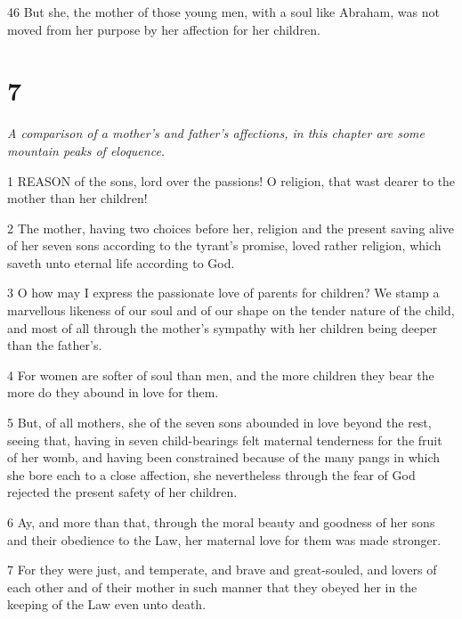 \par 46 But she, the mother of those young men, with a soul like Abraham, was not moved from her purpose by her affection for her children.

\chapter{7}

\par \textit{A comparison of a mother's and father's affections, in this chapter are some mountain peaks of eloquence.}

\par 1 REASON of the sons, lord over the passions! O religion, that wast dearer to the mother than her children!

\par 2 The mother, having two choices before her, religion and the present saving alive of her seven sons according to the tyrant's promise, loved rather religion, which saveth unto eternal life according to God.

\par 3 O how may I express the passionate love of parents for children? We stamp a marvellous likeness of our soul and of our shape on the tender nature of the child, and most of all through the mother's sympathy with her children being deeper than the father's.

\par 4 For women are softer of soul than men, and the more children they bear the more do they abound in love for them.

\par 5 But, of all mothers, she of the seven sons abounded in love beyond the rest, seeing that, having in seven child-bearings felt maternal tenderness for the fruit of her womb, and having been constrained because of the many pangs in which she bore each to a close affection, she nevertheless through the fear of God rejected the present safety of her children.

\par 6 Ay, and more than that, through the moral beauty and goodness of her sons and their obedience to the Law, her maternal love for them was made stronger.

\par 7 For they were just, and temperate, and brave and great-souled, and lovers of each other and of their mother in such manner that they obeyed her in the keeping of the Law even unto death.

